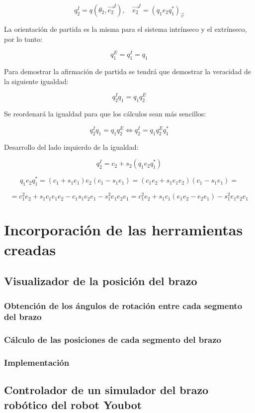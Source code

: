\documentclass[10pt, a4paper]{report}
\begin{document}
$$ q_{2}^I = q\left(\theta_2 , \vec{e_2}^I \right) , \quad \vec{e_2}^I = (q_1e_2q_1^*)_{\vec{v}} $$ 

La orientación de partida es la misma para el sistema intrínseco y el extrínseco, por lo tanto:

$$ q_1^E = q_1^I = q_1 $$

Para demostrar la afirmación de partida se tendrá que demostrar la veracidad de la siguiente igualdad:

$$ q_2^Iq_1 = q_1q_2^E $$

Se reordenará la igualdad para que los cálculos sean más sencillos:

$$ q_2^Iq_1 = q_1q_2^E \iff q_2^I = q_1q_2^Eq_1^* $$

Desarrollo del lado izquierdo de la igualdad:

$$ q_2^I = c_2 + s_2(q_1e_2q_1^*) $$

$$ q_1e_2q_1^* = (c_1 + s_1e_1)e_2(c_1 - s_1e_1) = (c_1e_2 + s_1e_1e_2)(c_1 - s_1e_1) = $$

$$ = c_1^2e_2 + s_1c_1e_1e_2 - c_1s_1e_2e_1 - s_1^2e_1e_2e_1 = c_1^2e_2 + s_1c_1(e_1e_2 - e_2e_1) - s_1^2e_1e_2e_1 $$

\section{Incorporación de las herramientas creadas}

\subsection{Visualizador de la posición del brazo}

\subsubsection{Obtención de los ángulos de rotación entre cada segmento del brazo}

\subsubsection{Cálculo de las posiciones de cada segmento del brazo}

\subsubsection{Implementación}

\subsection{Controlador de un simulador del brazo robótico del robot Youbot}
\end{document}
